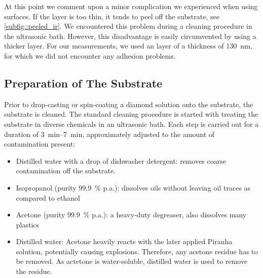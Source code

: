 	At this point we comment upon a minor complication we experienced when using \ir surfaces.
	If the \ir layer is too thin, it tends to peel off the substrate, see \autoref{subfig::peeled_ir}.
	We encountered this problem during a cleaning procedure in the ultrasonic bath.
	However, this disadvantage is easily circumvented by using a thicker \ir layer.
	For our measurements, we used an \ir layer of a thickness of \SI{130}{nm}, for which we did not encounter any adhesion problems.

	\subsection{Preparation of The Substrate}

	Prior to drop-casting or spin-coating a diamond solution onto the \ir substrate, the substrate is cleaned. 
	The standard cleaning procedure is started with treating the substrate in diverse chemicals in an ultrasonic bath. 
	Each step is carried out for a duration of \SIrange{3}{7}{\minute}, approximately adjusted to the amount of contamination present:

	\begin{itemize}
		\item Distilled water with a drop of dishwasher detergent: removes coarse contamination off the substrate.
		\item Isopropanol (purity \SI{99.9}{\percent} p.a.): dissolves oils without leaving oil traces as compared to ethanol
		\item Acetone (purity \SI{99.9}{\percent} p.a.): a heavy-duty degreaser, also dissolves many plastics
		\item Distilled water: Acetone heavily reacts with the later applied Piranha solution, potentially causing explosions. Therefore, any acetone residue has to be removed. As actetone is water-soluble, distilled water is used to remove the residue. 
	\end{itemize}

